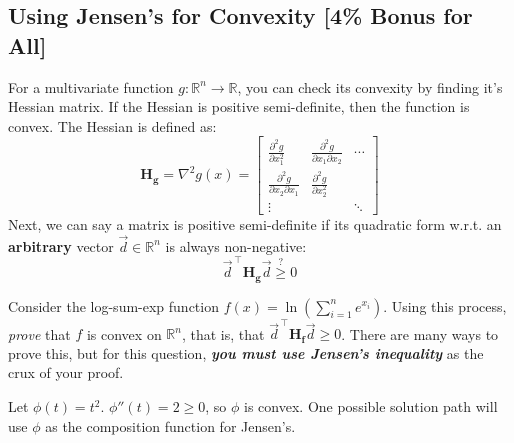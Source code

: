 \subsection{Using Jensen's for Convexity [4\% Bonus for All]}
For a multivariate function $g:\mathbb{R}^n\rightarrow\mathbb{R}$, you can check its convexity by finding it's Hessian matrix. If the Hessian is positive semi-definite, then the function is convex. The Hessian is defined as:
$$ \boldsymbol{H_g} = \nabla^2 g(x) = \begin{bmatrix}
    \frac{\partial^2g}{\partial x_1^2} & \frac{\partial^2g}{\partial x_1\partial x_2} & \cdots \\
    \frac{\partial^2g}{\partial x_2 \partial x_1} & \frac{\partial^2g}{\partial x_2^2} &  \\
    \vdots &  & \ddots
\end{bmatrix} $$
Next, we can say a matrix is positive semi-definite if its quadratic form w.r.t. an \textbf{arbitrary} vector $\vec{d}\in\mathbb{R}^n$ is always non-negative:
$$ \vec{d}^{\,\top} \boldsymbol{H_g} \vec{d} \overset{?}{\geq} 0 $$

Consider the log-sum-exp function $f(x) = \ln(\sum_{i=1}^n e^{x_i})$. Using this process, \emph{prove} that $f$ is convex on $\mathbb{R}^n$, that is, that $\vec{d}^{\,\top} \boldsymbol{H_f} \vec{d} \geq 0$. There are many ways to prove this, but for this question, \textbf{\emph{you must use Jensen's inequality}} as the crux of your proof.

\begin{hintbox}
    Let $\phi(t) = t^2$. $\phi''(t)=2\geq 0$, so $\phi$ is convex. One possible solution path will use $\phi$ as the composition function for Jensen's.
\end{hintbox}

